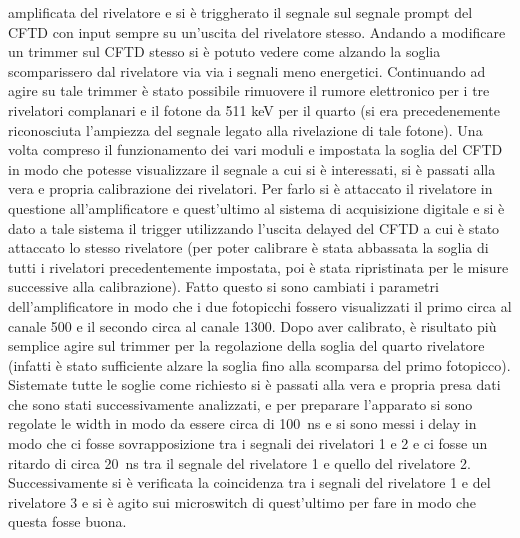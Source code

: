 amplificata del rivelatore e si è triggherato il segnale sul segnale prompt del CFTD con input sempre su un'uscita del rivelatore stesso. Andando a modificare un trimmer
sul CFTD stesso si è potuto vedere come alzando la soglia scomparissero dal rivelatore via via i segnali meno energetici. Continuando ad agire su tale trimmer è stato
possibile rimuovere il rumore elettronico per i tre rivelatori complanari e il fotone da 511 keV per il quarto (si era precedenemente riconosciuta l'ampiezza del segnale
legato alla rivelazione di tale fotone). Una volta compreso il funzionamento dei vari moduli e impostata la soglia del CFTD in modo che potesse visualizzare il segnale
a cui si è interessati, si è passati alla vera e propria calibrazione dei rivelatori. Per farlo si è attaccato il rivelatore in questione all'amplificatore e quest'ultimo
al sistema di acquisizione digitale e si è dato a tale sistema il trigger utilizzando l'uscita delayed del CFTD a cui è stato attaccato lo stesso rivelatore (per poter
calibrare è stata abbassata la soglia di tutti i rivelatori precedentemente impostata, poi è stata ripristinata per le misure successive alla calibrazione). Fatto questo si
sono cambiati i parametri dell'amplificatore in modo che i due fotopicchi fossero visualizzati il primo circa al canale 500 e il secondo circa al canale 1300. Dopo aver
calibrato, è risultato più semplice agire sul trimmer per la regolazione della soglia del quarto rivelatore (infatti è stato sufficiente alzare la soglia fino alla scomparsa
del primo fotopicco).
Sistemate tutte le soglie come richiesto si è passati alla vera e propria presa dati che sono stati successivamente analizzati, e per preparare l'apparato si sono
regolate le width in modo da essere circa di 100~ns e si sono messi i delay in modo che ci fosse sovrapposizione tra i segnali dei rivelatori 1 e 2 e ci fosse un
ritardo di circa 20~ns tra il segnale del rivelatore 1 e quello del rivelatore 2. Successivamente si è verificata la coincidenza tra i segnali del rivelatore 1 e del
rivelatore 3 e si è agito sui microswitch di quest'ultimo per fare in modo che questa fosse buona.\\

